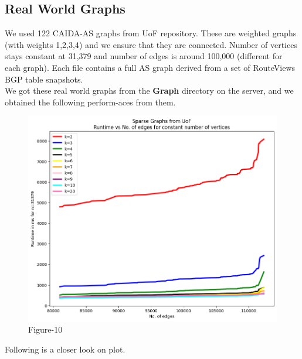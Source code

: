 \documentclass[12pt, a4paper]{article}
\begin{document}
    
    \subsection{Real World Graphs}
    We used 122 CAIDA-AS graphs from UoF repository. These are weighted graphs (with weights {1,2,3,4}) and we ensure that they are connected. Number of vertices stays constant at 31,379 and number of edges is around 100,000 (different for each graph). Each file contains a full
AS graph derived from a set of RouteViews BGP table snapshots.            \\
    We got these real world graphs from the \textbf{Graph} directory on the server, and we obtained the following perform-aces from them.

    \begin{figure}[H]
    \caption*{Figure-10}
    
        \centering
    \includegraphics[scale=0.75]{./sparse/16}
    \end{figure}
    Following is a closer look on plot.
\end{document}
